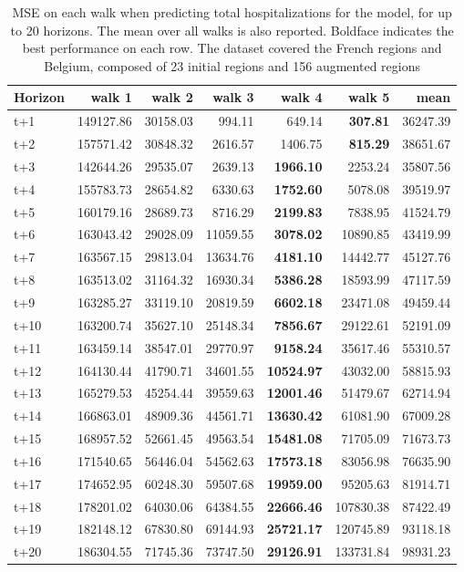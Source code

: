 \begin{table}[H]
\centering
\caption{MSE on each walk when predicting total hospitalizations for the model, for up to 20 horizons. The mean over all walks is also reported. Boldface indicates the best performance on each row. The dataset covered the French regions and Belgium, composed of 23 initial regions and 156 augmented regions }
\label{tab:MSE_walk_encoder_decoder}
\begin{tabular}{lrrrrrr}
\toprule
Horizon &    walk 1 &   walk 2 &   walk 3 &   walk 4 &    walk 5 &     mean \\
\midrule
t+1  & 149127.86  & 30158.03  & 994.11  & 649.14  & \textbf{307.81}  & 36247.39  \\
t+2  & 157571.42  & 30848.32  & 2616.57  & 1406.75  & \textbf{815.29}  & 38651.67  \\
t+3  & 142644.26  & 29535.07  & 2639.13  & \textbf{1966.10}  & 2253.24  & 35807.56  \\
t+4  & 155783.73  & 28654.82  & 6330.63  & \textbf{1752.60}  & 5078.08  & 39519.97  \\
t+5  & 160179.16  & 28689.73  & 8716.29  & \textbf{2199.83}  & 7838.95  & 41524.79  \\
t+6  & 163043.42  & 29028.09  & 11059.55  & \textbf{3078.02}  & 10890.85  & 43419.99  \\
t+7  & 163567.15  & 29813.04  & 13634.76  & \textbf{4181.10}  & 14442.77  & 45127.76  \\
t+8  & 163513.02  & 31164.32  & 16930.34  & \textbf{5386.28}  & 18593.99  & 47117.59  \\
t+9  & 163285.27  & 33119.10  & 20819.59  & \textbf{6602.18}  & 23471.08  & 49459.44  \\
t+10  & 163200.74  & 35627.10  & 25148.34  & \textbf{7856.67}  & 29122.61  & 52191.09  \\
t+11  & 163459.14  & 38547.01  & 29770.97  & \textbf{9158.24}  & 35617.46  & 55310.57  \\
t+12  & 164130.44  & 41790.71  & 34601.55  & \textbf{10524.97}  & 43032.00  & 58815.93  \\
t+13  & 165279.53  & 45254.44  & 39559.63  & \textbf{12001.46}  & 51479.67  & 62714.94  \\
t+14  & 166863.01  & 48909.36  & 44561.71  & \textbf{13630.42}  & 61081.90  & 67009.28  \\
t+15  & 168957.52  & 52661.45  & 49563.54  & \textbf{15481.08}  & 71705.09  & 71673.73  \\
t+16  & 171540.65  & 56446.04  & 54562.63  & \textbf{17573.18}  & 83056.98  & 76635.90  \\
t+17  & 174652.95  & 60248.30  & 59507.68  & \textbf{19959.00}  & 95205.63  & 81914.71  \\
t+18  & 178201.02  & 64030.06  & 64384.55  & \textbf{22666.46}  & 107830.38  & 87422.49  \\
t+19  & 182148.12  & 67830.80  & 69144.93  & \textbf{25721.17}  & 120745.89  & 93118.18  \\
t+20  & 186304.55  & 71745.36  & 73747.50  & \textbf{29126.91}  & 133731.84  & 98931.23  \\

\bottomrule
\end{tabular}
\end{table}
